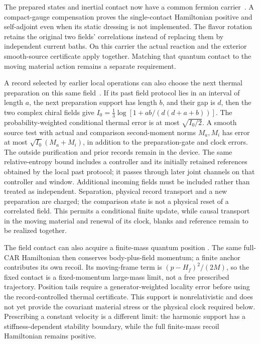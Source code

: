 The prepared states and inertial contact now have a common fermion
carrier~\cite[Proposition on a positive contact on the full CAR
carrier]{QRC}. A compact-gauge compensation proves the single-contact
Hamiltonian positive and self-adjoint even when its static dressing
is not implemented. The flavor rotation retains the original two
fields' correlations instead of replacing them by independent current
baths. On this carrier the actual reaction and the exterior
smooth-source certificate apply together. Matching that quantum
contact to the moving material action remains a separate requirement.

A record selected by earlier local operations can also choose the
next thermal preparation on this same field~\cite[Proposition on
record-selected local thermal preparation]{QRC}. If its past field
protocol lies in an interval of length $a$, the next preparation
support has length $b$, and their gap is $d$, then the two complex
chiral fields give
$I_0=\frac13\log[1+ab/(d(d+a+b))]$.
The probability-weighted conditional thermal error is at most
$\sqrt{I_0/2}$. A smooth source test with actual and comparison
second-moment norms $M_a,M_i$ has error at most
$\sqrt{I_0}(M_a+M_i)$, in addition to the preparation-gate and clock
errors. The outside purification and prior records remain in the
device. The same relative-entropy bound includes a controller and
its initially retained references obtained by the local past protocol;
it passes through later joint channels on that controller and window.
Additional incoming fields must be included rather than treated as
independent. Separation, physical record transport and a new preparation
are charged; the comparison state is not a physical reset of a
correlated field. This permits a conditional finite update, while
causal transport in the moving material and renewal of its clock,
blanks and reference remain to be realized together.

The field contact can also acquire a finite-mass quantum position
\cite[Section on the contact position]{QRC}. The same full-CAR
Hamiltonian then conserves body-plus-field momentum; a finite anchor
contributes its own recoil. Its moving-frame term is
$(p-H_f)^2/(2M)$, so the fixed contact is a fixed-momentum large-mass limit, not
a free prescribed trajectory. Position tails require a generator-weighted
locality error before using the record-controlled thermal certificate.
This support is nonrelativistic and does not yet provide the covariant
material stress or the physical clock required below.
Prescribing a constant velocity is a different limit: the harmonic
support has a stiffness-dependent stability boundary, while the full
finite-mass recoil Hamiltonian remains positive.

